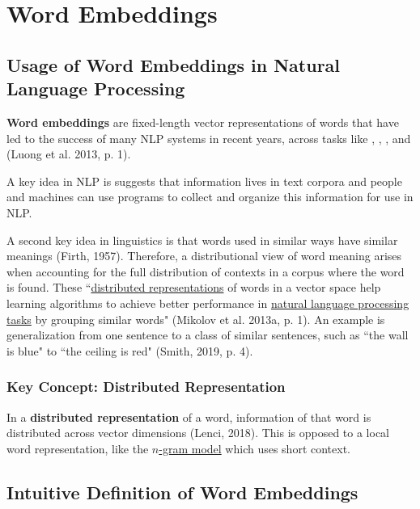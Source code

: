 \section{Word Embeddings} \label{sec:WordEmbeddings}


\subsection{Usage of Word Embeddings in Natural Language Processing} \label{sec:WordEmb_Useage}


\textbf{Word embeddings} are fixed-length vector representations of words that have led to the success of many NLP systems in recent years, across tasks like , , , and  (Luong et al. 2013, p. 1).

A key idea in NLP is suggests that information lives in text corpora and people and machines can use programs to collect and organize this information for use in NLP. 

A second key idea in linguistics is that words used in similar ways have similar meanings (Firth, 1957). Therefore, a distributional view of word meaning arises when accounting for the full distribution of contexts in a corpus where the word is found. These  ``\hyperref[sec:DistributedRepr]{distributed representations} of words in a vector space help learning algorithms to achieve better performance in \hyperref[app:Appendix_NLPTasks]{natural language processing tasks} by grouping similar words" (Mikolov et al. 2013a, p. 1). An example is generalization from one sentence to a class of similar sentences, such as ``the wall is blue" to ``the ceiling is red" (Smith, 2019, p. 4). 

\subsubsection{Key Concept: Distributed Representation} \label{sec:DistributedRepr}

In a \textbf{distributed representation} of a word, information of that word is distributed across vector dimensions (Lenci, 2018). This is opposed to a local word representation, like the \hyperref[sec:NGramLM]{$n$-gram model} which uses short context. 

\subsection{Intuitive Definition of Word Embeddings} \label{sec:WordEmb_Intuition}

